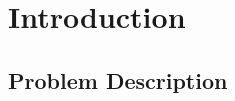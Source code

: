 \chapter{Introduction}
\label{cha:introduction}



\section{Problem Description}
\label{sec:problem-description}

